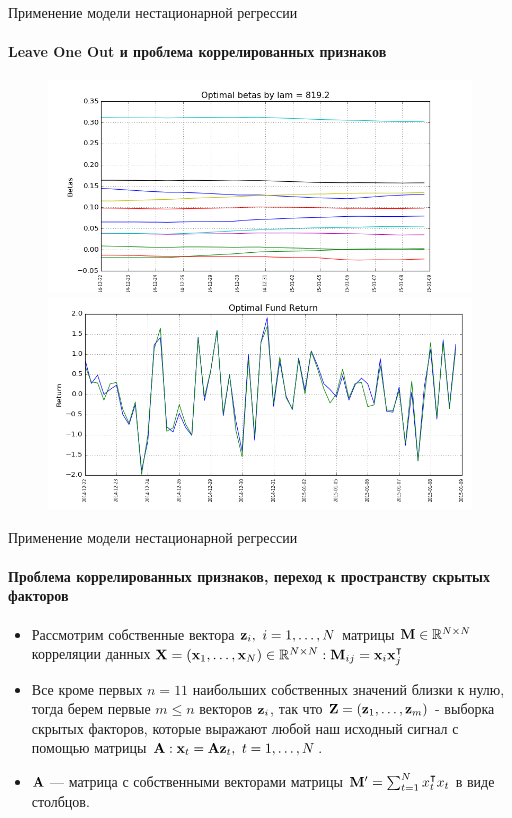 \documentclass[11pt]{beamer}
\def\trans{^\intercal}
\begin{document}
\begin{frame}{Применение модели нестационарной регрессии}
\framesubtitle{Leave One Out и проблема коррелированных признаков}

\begin{figure}
\centering
\includegraphics[scale=0.25]{loo_beta.png}\\
\centering
\includegraphics[scale=0.25]{loo_return.png}
\end{figure}
\end{frame}

\begin{frame}{Применение модели нестационарной регрессии}
\framesubtitle{Проблема коррелированных признаков, переход к пространству скрытых факторов}
\begin{itemize}
\item Рассмотрим собственные вектора ${\bf{z}}_i,\ i=1,\dots,N$ матрицы ${\bf{M}} \in \mathbb R^{N\times N}$ корреляции данных ${\bf{X}} = ({\bf{x}}_1,\dots, {\bf{x}}_N) \in \mathbb R^{N\times N}: {\bf{M}}_{ij} = {\bf{x}}_i {\bf{x}}
_j\trans $
\item Все кроме первых $n=11$ наибольших собственных значений близки к нулю, тогда берем первые $m \leq n$ векторов ${\bf{z}}_i$, так что ${\bf{Z}} = ({\bf{z}}_1, \dots, {\bf{z}}_m)$ - выборка скрытых факторов, которые выражают любой наш исходный сигнал с помощью матрицы ${\bf{A}}: {\bf{x}}_t = {\bf{A}} {\bf{z}}_t,\ t=1,\dots, N$. 
\item ${\bf{A}}$ --- матрица с собственными векторами матрицы ${\bf{M}}^\prime = \sum_{t=1}^N x_t\trans x_t $ в виде столбцов.
\end{itemize}

\end{frame}
\end{document}
